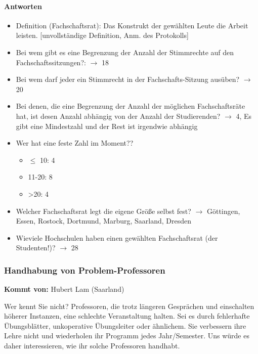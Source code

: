       \paragraph{Antworten}
        \begin{itemize}
          \item Definition (Fachschaftsrat): Das Konstrukt der gewählten Leute die Arbeit leisten. [unvollständige Definition, Anm. des Protokolls]
          \item Bei wem gibt es eine Begrenzung der Anzahl der Stimmrechte auf den Fachschaftssitzungen?: $\rightarrow$ 18
          \item Bei wem darf jeder ein Stimmrecht in der Fachschafts-Sitzung ausüben? $\rightarrow$ 20
          \item Bei denen, die eine Begrenzung der Anzahl der möglichen Fachschaftsräte hat, ist desen Anzahl abhängig von der Anzahl der Studierenden? $\rightarrow$ 4, Es gibt eine Mindestzahl und der Rest ist irgendwie abhängig
          \item Wer hat eine feste Zahl im Moment??
            \begin{itemize}
              \item $\leq$ 10: 4 %
              \item 11-20: 8
              \item >20: 4
            \end{itemize}
          \item Welcher Fachschaftsrat legt die eigene Größe selbst fest? $\rightarrow$ Göttingen, Essen, Rostock, Dortmund, Marburg, Saarland, Dresden
          \item Wieviele Hochschulen haben einen gewählten Fachschaftsrat (der Studenten!)? $\rightarrow$ 28
        \end{itemize}

    \subsubsection*{Handhabung von Problem-Professoren}
      \textbf{Kommt von:} Hubert Lam (Saarland)

      Wer kennt Sie nicht? Professoren, die trotz längeren Gesprächen und einschalten höherer Instanzen, eine schlechte Veranstaltung halten. Sei es durch fehlerhafte Übungsblätter, unkoperative Übungsleiter oder ähnlichem. Sie verbessern ihre Lehre nicht und wiederholen ihr Programm jedes Jahr/Semester. Uns würde es daher interessieren, wie ihr solche Professoren handhabt. \\

